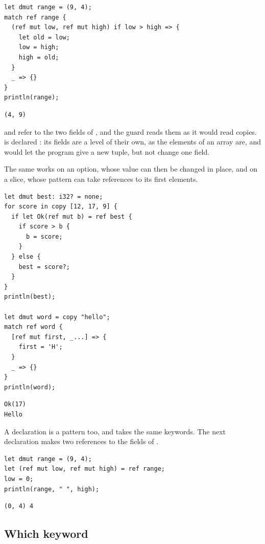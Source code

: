 \begin{lstlisting}[style=coloredverbatim]
let dmut range = (9, 4);
match ref range {
  (ref mut low, ref mut high) if low > high => {
    let old = low;
    low = high;
    high = old;
  }
  _ => {}
}
println(range);
\end{lstlisting}
\vspace{-10pt}%
\begin{lstlisting}[style=bashVerb]
(4, 9)
\end{lstlisting}

 and  refer to the two fields of , and the
guard reads them as it would read copies.  is declared
: its fields are a level of their own, as the elements of an array
are, and  would let the program give  a new tuple,
but not change one field.

The same works on an option, whose value can then be changed in place, and on
a slice, whose pattern can take references to its first elements.

\begin{lstlisting}[style=coloredverbatim]
let dmut best: i32? = none;
for score in copy [12, 17, 9] {
  if let Ok(ref mut b) = ref best {
    if score > b {
      b = score;
    }
  } else {
    best = score?;
  }
}
println(best);

let dmut word = copy "hello";
match ref word {
  [ref mut first, _...] => {
    first = 'H';
  }
  _ => {}
}
println(word);
\end{lstlisting}
\vspace{-10pt}%
\begin{lstlisting}[style=bashVerb]
Ok(17)
Hello
\end{lstlisting}

A  declaration is a pattern too, and takes the same keywords. The
next declaration makes two references to the fields of .

\begin{lstlisting}[style=coloredverbatim]
let dmut range = (9, 4);
let (ref mut low, ref mut high) = ref range;
low = 0;
println(range, " ", high);
\end{lstlisting}
\vspace{-10pt}%
\begin{lstlisting}[style=bashVerb]
(0, 4) 4
\end{lstlisting}

\subsection{Which keyword}

